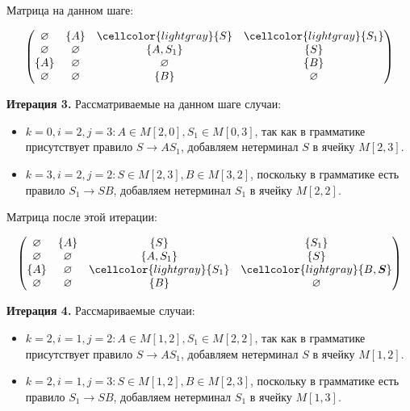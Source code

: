 \begin{example}
Матрица на данном шаге:

\[
\begin{pmatrix}
\varnothing & \{A\}       & \cellcolor{lightgray}\{S\}       & \cellcolor{lightgray}\{S_1\}     \\
\varnothing & \varnothing & \{A, S_1\}  & \{S\}       \\
\{A\}       & \varnothing & \varnothing & \{B\}       \\
\varnothing & \varnothing & \{B\}       & \varnothing \\
\end{pmatrix}
\]

\textbf{Итерация 3.}
Рассматриваемые на данном шаге случаи:

\begin{itemize}
    \setlength\itemsep{1em}
    \item $k = 0, i = 2, j = 3: A \in M[2, 0], S_1 \in M[0, 3]$, так как в грамматике присутствует правило $S \to A S_1$, добавляем нетерминал $S$ в ячейку $M[2, 3]$.
    \item $k = 3, i = 2, j = 2: S \in M[2, 3], B \in M[3, 2]$, поскольку в грамматике есть правило $S_1 \to S B$, добавляем нетерминал $S_1$ в ячейку $M[2, 2]$.
\end{itemize}

Матрица после этой итерации:

\[
\begin{pmatrix}
\varnothing & \{A\}       & \{S\}      & \{S_1\}     \\
\varnothing & \varnothing & \{A, S_1\} & \{S\}       \\
\{A\}       & \varnothing & \cellcolor{lightgray}\{S_1\}    & \cellcolor{lightgray}\{B, \boldsymbol{S}\}    \\
\varnothing & \varnothing & \{B\}      & \varnothing \\
\end{pmatrix}
\]

\textbf{Итерация 4.}
Рассмариваемые случаи:

\begin{itemize}
    \setlength\itemsep{1em}
    \item $k = 2, i = 1, j = 2: A \in M[1, 2], S_1 \in M[2, 2]$, так как в грамматике присутствует правило $S \to A S_1$, добавляем нетерминал $S$ в ячейку $M[1, 2]$.
    \item $k = 2, i = 1, j = 3: S \in M[1, 2], B \in M[2, 3]$, поскольку в грамматике есть правило $S_1 \to S B$, добавляем нетерминал $S_1$ в ячейку $M[1, 3]$.
\end{itemize}


\end{example}
